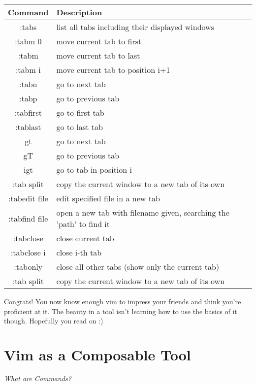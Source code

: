 \documentclass[12pt, letterpaper]{article}
\begin{document}
\begin{table}[H]
    \begin{tabular}{|c|p{9cm}|}
        Command & Description \\
        \hline
        :tabs & list all tabs including their displayed windows \\
        \hline
        :tabm 0 & move current tab to first \\
        \hline
        :tabm & move current tab to last \\
        \hline
        :tabm {i} & move current tab to position i+1 \\
        \hline
        :tabn & go to next tab \\
        \hline
        :tabp & go to previous tab \\
        \hline
        :tabfirst & go to first tab \\
        \hline
        :tablast & go to last tab \\
        \hline
        gt & go to next tab \\
        \hline
        gT & go to previous tab \\
        \hline
        {i}gt & go to tab in position i \\
        \hline
        :tab split & copy the current window to a new tab of its own \\
        \hline
        :tabedit {file} & edit specified file in a new tab \\
        \hline
        :tabfind {file} & open a new tab with filename given, searching the
        'path' to find it \\
        \hline
        :tabclose & close current tab \\
        \hline
        :tabclose {i} & close i-th tab \\
        \hline
        :tabonly & close all other tabs (show only the current tab) \\
        \hline
        :tab split & copy the current window to a new tab of its own \\
        \hline
    \end{tabular}
\end{table}

Congrats! You now know enough vim to impress your friends and think you're
proficient at it. The beauty in a tool isn't learning how to use the basics of
it though. Hopefully you read on :)


\section{Vim as a Composable Tool}
\textit{What are Commands?}
\end{document}
